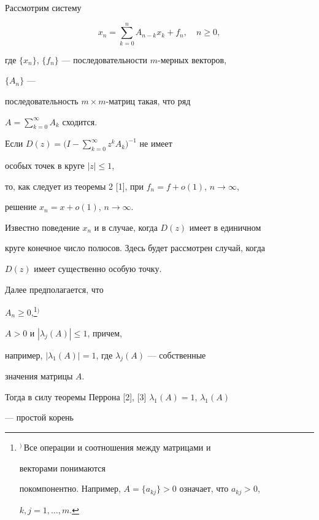 \label{begin} 


 


Рассмотрим систему 


\begin{equation} 


x_n=\sum^n_{k=0}A_{n-k}x_k+f_n,\quad n\ge0, 


\end{equation} 


где $\{x_n\}$, $\{f_n\}$ --- последовательности $m$-мерных векторов, 


$\{A_n\}$ --- 


последовательность $m\times m$-матриц такая, что ряд 


$A=\sum\limits^\infty_{k=0}A_k$ сходится. 


 


Если $D(z)=\Big(I-\sum\limits^\infty_{k=0}z^k{}A_k\Big)^{-1}$ не имеет 


особых точек в круге $|z|\le1$, 


то, как следует из теоремы 2 [1], при $f_n=f+o(1)$, $n\to\infty$, 


решение $x_n=x+o(1)$, $n\to\infty$. 


 


Известно поведение $x_n$ и в случае, когда $D(z)$ имеет в единичном 


круге конечное число полюсов. Здесь будет рассмотрен случай, когда 


$D(z)$ имеет существенно особую точку. 


 


Далее предполагается, что 


$A_n\ge0$,\footnote{$^)$\,Все операции и соотношения между матрицами и 


векторами понимаются 


покомпонентно. Например, $A=\{a_{kj}\}>0$ означает, что $a_{kj}>0$, 


$k,j=1,\dotsc,m$.}{$^)$} 


$A>0$ и $|\lambda_j(A)|\le1$, причем, 


например, $|\lambda_1(A)|=1$, где $\lambda_j(A)$ --- собственные 


значения матрицы $A$. 


Тогда в силу теоремы Перрона [2], [3] $\lambda_1(A)=1$, $\lambda_1(A)$ 


--- простой корень 


